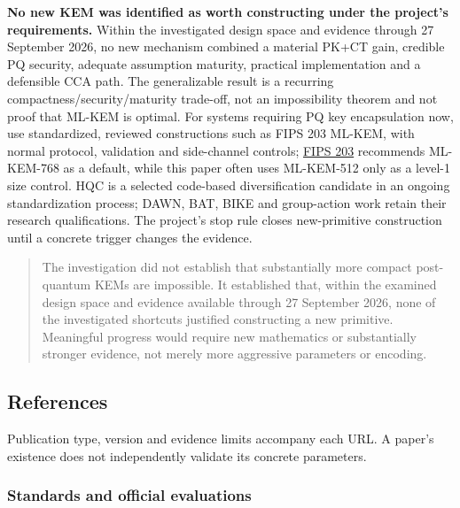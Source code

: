 \documentclass[
  10pt,
  a4paper,
]{article}
\begin{document}
\textbf{No new KEM was identified as worth constructing under the
project's requirements.} Within the investigated design space and
evidence through 27 September 2026, no new mechanism combined a material
PK+CT gain, credible PQ security, adequate assumption maturity,
practical implementation and a defensible CCA path. The generalizable
result is a recurring compactness/security/maturity trade-off, not an
impossibility theorem and not proof that ML-KEM is optimal. For systems
requiring PQ key encapsulation now, use standardized, reviewed
constructions such as FIPS 203 ML-KEM, with normal protocol, validation
and side-channel controls;
\href{https://nvlpubs.nist.gov/nistpubs/FIPS/NIST.FIPS.203.pdf}{FIPS
203} recommends ML-KEM-768 as a default, while this paper often uses
ML-KEM-512 only as a level-1 size control. HQC is a selected code-based
diversification candidate in an ongoing standardization process; DAWN,
BAT, BIKE and group-action work retain their research qualifications.
The project's stop rule closes new-primitive construction until a
concrete trigger changes the evidence.

\begin{quote}
The investigation did not establish that substantially more compact
post-quantum KEMs are impossible. It established that, within the
examined design space and evidence available through 27 September 2026,
none of the investigated shortcuts justified constructing a new
primitive. Meaningful progress would require new mathematics or
substantially stronger evidence, not merely more aggressive parameters
or encoding.
\end{quote}

\clearpage

\hypertarget{references}{%
\subsection{References}\label{references}}

\begingroup\small{}

Publication type, version and evidence limits accompany each URL. A
paper's existence does not independently validate its concrete
parameters.

\hypertarget{standards-and-official-evaluations}{%
\subsubsection{Standards and official
evaluations}\label{standards-and-official-evaluations}}
\end{document}
